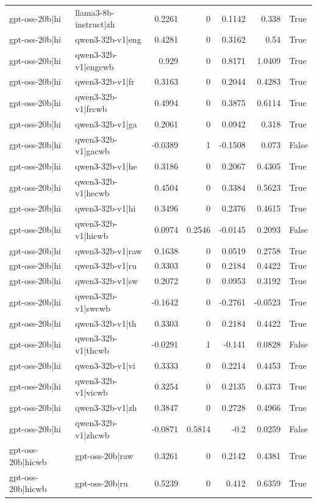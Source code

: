 \begin{table}
\begin{tabular}{l l r r r r l}
gpt-oss-20b|hi & llama3-8b-instruct|zh & 0.2261 & 0 & 0.1142 & 0.338 & True \\
gpt-oss-20b|hi & qwen3-32b-v1|eng & 0.4281 & 0 & 0.3162 & 0.54 & True \\
gpt-oss-20b|hi & qwen3-32b-v1|engcwb & 0.929 & 0 & 0.8171 & 1.0409 & True \\
gpt-oss-20b|hi & qwen3-32b-v1|fr & 0.3163 & 0 & 0.2044 & 0.4283 & True \\
gpt-oss-20b|hi & qwen3-32b-v1|frcwb & 0.4994 & 0 & 0.3875 & 0.6114 & True \\
gpt-oss-20b|hi & qwen3-32b-v1|ga & 0.2061 & 0 & 0.0942 & 0.318 & True \\
gpt-oss-20b|hi & qwen3-32b-v1|gacwb & -0.0389 & 1 & -0.1508 & 0.073 & False \\
gpt-oss-20b|hi & qwen3-32b-v1|he & 0.3186 & 0 & 0.2067 & 0.4305 & True \\
gpt-oss-20b|hi & qwen3-32b-v1|hecwb & 0.4504 & 0 & 0.3384 & 0.5623 & True \\
gpt-oss-20b|hi & qwen3-32b-v1|hi & 0.3496 & 0 & 0.2376 & 0.4615 & True \\
gpt-oss-20b|hi & qwen3-32b-v1|hicwb & 0.0974 & 0.2546 & -0.0145 & 0.2093 & False \\
gpt-oss-20b|hi & qwen3-32b-v1|raw & 0.1638 & 0 & 0.0519 & 0.2758 & True \\
gpt-oss-20b|hi & qwen3-32b-v1|ru & 0.3303 & 0 & 0.2184 & 0.4422 & True \\
gpt-oss-20b|hi & qwen3-32b-v1|sw & 0.2072 & 0 & 0.0953 & 0.3192 & True \\
gpt-oss-20b|hi & qwen3-32b-v1|swcwb & -0.1642 & 0 & -0.2761 & -0.0523 & True \\
gpt-oss-20b|hi & qwen3-32b-v1|th & 0.3303 & 0 & 0.2184 & 0.4422 & True \\
gpt-oss-20b|hi & qwen3-32b-v1|thcwb & -0.0291 & 1 & -0.141 & 0.0828 & False \\
gpt-oss-20b|hi & qwen3-32b-v1|vi & 0.3333 & 0 & 0.2214 & 0.4453 & True \\
gpt-oss-20b|hi & qwen3-32b-v1|vicwb & 0.3254 & 0 & 0.2135 & 0.4373 & True \\
gpt-oss-20b|hi & qwen3-32b-v1|zh & 0.3847 & 0 & 0.2728 & 0.4966 & True \\
gpt-oss-20b|hi & qwen3-32b-v1|zhcwb & -0.0871 & 0.5814 & -0.2 & 0.0259 & False \\
gpt-oss-20b|hicwb & gpt-oss-20b|raw & 0.3261 & 0 & 0.2142 & 0.4381 & True \\
gpt-oss-20b|hicwb & gpt-oss-20b|ru & 0.5239 & 0 & 0.412 & 0.6359 & True \\

\end{tabular}
\end{table}
